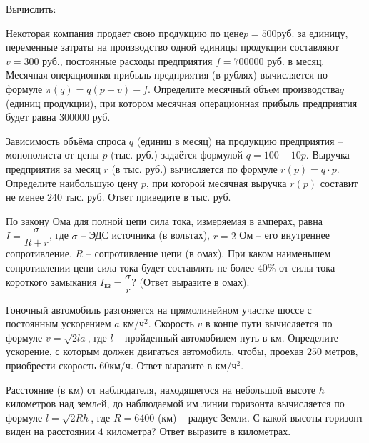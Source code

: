 \begin{listofex}
	\item Вычислить:
	\begin{enumcols}[itemcolumns=3]
		\item {}
		\item {}
		\item {}
		\item {}
		\item {}
		\item {}
		\item {}
	\end{enumcols}
	\item Некоторая компания продает свою продукцию по цене\(  p=500  \)руб. за единицу, переменные затраты на производство одной единицы продукции составляют  \( v=300 \) руб., постоянные расходы предприятия \( f=700000 \) руб. в месяц. Месячная операционная прибыль предприятия (в рублях) вычисляется по формуле  \( \pi(q)=q(p-v)-f \). Определите месячный объeм производства\(  q \) (единиц продукции), при котором месячная операционная прибыль предприятия будет равна \( 300000 \) руб.
	\item Зависимость объёма спроса \( q \) (единиц в месяц) на продукцию предприятия – монополиста от цены \( p \) (тыс. руб.) задаётся формулой \( q=100-10p \). Выручка предприятия за месяц \( r \) (в тыс. руб.) вычисляется по формуле \( r(p)=q\cdot p \). Определите наибольшую цену \( p \), при которой месячная выручка \( r(p) \) составит не менее \( 240 \) тыс. руб. Ответ приведите в тыс. руб.
	\item По закону Ома для полной цепи сила тока, измеряемая в амперах, равна \( I=\dfrac{\sigma}{R+r} \), где \(\sigma\) – ЭДС источника (в вольтах), \(r=2\) Ом – его внутреннее сопротивление, \(R\) – сопротивление цепи (в омах). При каком наименьшем сопротивлении цепи сила тока будет составлять не более \(40\% \) от силы тока короткого замыкания \( I_{кз} =\dfrac{\sigma}{r}\)? (Ответ выразите в омах).
	\item Гоночный автомобиль разгоняется на прямолинейном участке шоссе с постоянным ускорением \( a \) км/ч\( ^2 \). Скорость \( v \)  в конце пути вычисляется по формуле \( v=\sqrt{2la} \), где \( l \) – пройденный автомобилем путь в км. Определите ускорение, с которым должен двигаться автомобиль, чтобы, проехав \( 250 \) метров, приобрести скорость \( 60 \)км/ч. Ответ выразите в км/ч\( ^2 \).
	\item Расстояние (в км) от наблюдателя, находящегося на небольшой высоте \( h \) километров над землeй, до наблюдаемой им линии горизонта вычисляется по формуле \( l=\sqrt{2Rh} \), где \( R = 6400 \) (км) – радиус Земли. С какой высоты горизонт виден на расстоянии \(4\) километра? Ответ выразите в километрах.

\end{listofex}
